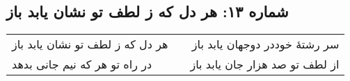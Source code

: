 \begin{center}
\section*{شماره ۱۳: هر دل که ز لطف تو نشان یابد باز}
\label{sec:013}
\begin{longtable}{l p{0.5cm} r}
هر دل که ز لطف تو نشان یابد باز
&&
سر رشتهٔ خوددر دوجهان یابد باز
\\
در راه تو هر که نیم جانی بدهد
&&
از لطف تو صد هزار جان یابد باز
\\
\end{longtable}
\end{center}
